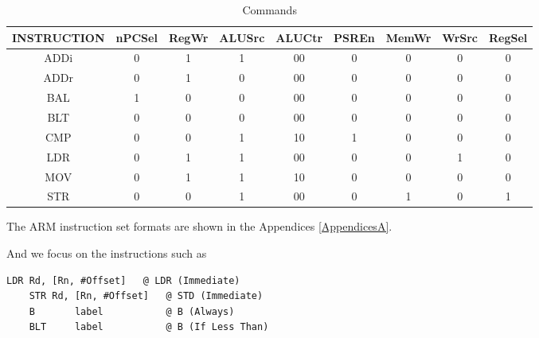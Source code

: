 \begin{table}[htp]
    \caption{Commands}
    \label{tab:command}
    \resizebox{\textwidth}{!}
    {
        \begin{tabular}{@{}ccccccccc@{}}
        \toprule
        \textbf{INSTRUCTION} & \textbf{nPCSel} & \textbf{RegWr} & \textbf{ALUSrc} & \textbf{ALUCtr} & \textbf{PSREn} & \textbf{MemWr} & \textbf{WrSrc} & \textbf{RegSel} \\ \midrule
        ADDi                 &       0         &          1     &      1          &       00         &     0          &       0        &      0         &   0             \\
        ADDr                 &       0         &         1      &      0          &      00          &      0         &        0       &       0        &  0              \\
        BAL                  &         1       &        0       &     0           &    00            &     0          &     0          &     0          &    0            \\
        BLT                  &         0       &           0    &          0      &      00         &       0        &         0      &        0       &      0          \\
        CMP                  &       0         &    0           &    1            &    10           &     1          &     0          &        0       &   0             \\
        LDR                  &         0       &      1         &         1       &      00          &        0       &         0      &       1        &    0            \\
        MOV                  &         0       &       1        &           1     &         10       &       0        &     0          &        0       &      0          \\
        STR                  &         0       &   0            &       1         &       00         &       0        &       1        &       0        &      1          \\ \bottomrule
        \end{tabular}
    }
\end{table}

The ARM instruction set formats are shown in the Appendices \ref{AppendicesA}.

And we focus on the instructions such as
\begin{lstlisting}[style = Arm, columns = fixed]
    LDR Rd, [Rn, #Offset]   @ LDR (Immediate)
    STR Rd, [Rn, #Offset]   @ STD (Immediate)
    B       label           @ B (Always)
    BLT     label           @ B (If Less Than)
\end{lstlisting}

